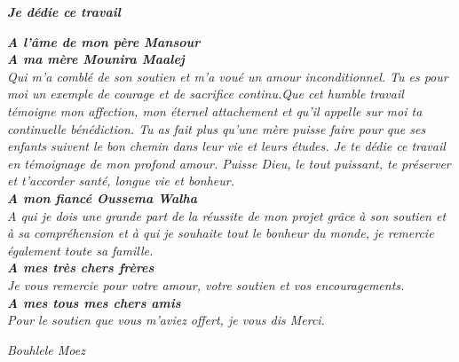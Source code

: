 \begin{center}
\textit{\textsl{\textbf{Je dédie ce travail}}}
\end{center}
\begin{center}
\textsl{%
 \textbf{A l'âme de mon père Mansour}
 \\[0.2in]
 \textbf{A ma mère Mounira Maalej}\\
 Qui m'a comblé de son soutien et m'a
voué un amour inconditionnel. Tu es pour moi un exemple de
courage et de sacrifice continu.Que cet humble travail témoigne
mon affection, mon éternel attachement et qu'il appelle sur moi
ta continuelle bénédiction. Tu as fait plus qu’une mère puisse faire pour que ses
enfants suivent le bon chemin dans leur vie et leurs études.
Je te dédie ce travail en témoignage de mon profond
amour. Puisse Dieu, le tout puissant, te préserver et
t’accorder santé, longue vie et bonheur.
\\[0.2in]
\textbf{A mon fiancé Oussema Walha}\\
A qui je dois une grande part de la réussite de mon projet grâce à
son soutien et à sa compréhension et à qui je souhaite tout le bonheur du monde,
je remercie également toute sa famille.
\\[0.2in]
\textbf{A mes très chers frères}\\
Je vous remercie pour votre amour,
votre soutien et vos encouragements.
\\[0.2in]
\textbf{A mes tous mes chers amis}\\
Pour le soutien que vous m'aviez
offert, je vous dis Merci.}
\begin{flushright}
 \textit{\emph{Bouhlele Moez}}
\end{flushright}

\end{center}
